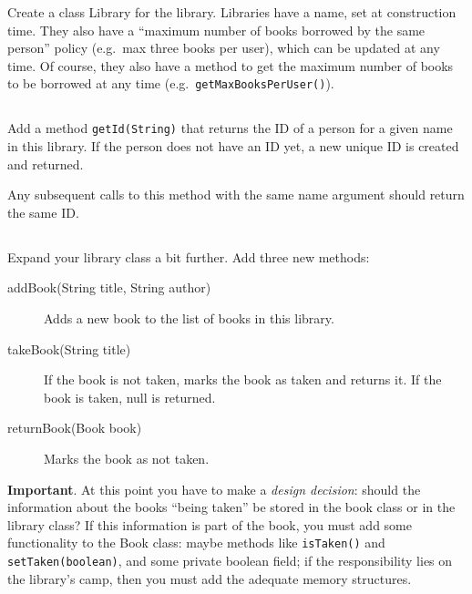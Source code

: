 \documentclass{article}
\begin{document}
Create a class Library for the library. Libraries have a name, set at
construction time. They also have a ``maximum number of books borrowed
by the same person'' policy (e.g.~max three books per user), 
which can be updated at any time. Of
course, they also have a method to get the maximum number of books to
be borrowed at any time (e.g.~\verb+getMaxBooksPerUser()+). 

\subsection{}

Add a method \verb+getId(String)+ that returns the ID of a person for
a given name in this library. If the person does not have an ID yet,
a new unique ID is created and returned. 

Any subsequent calls to this
method with the same name argument should return the same ID. 

\subsection{}

Expand your library class a bit further. Add three new methods: 

\begin{description}
\item[addBook(String title, String author)] Adds a new book to the
  list of books in this library.
\item[takeBook(String title)] If the book is not taken, marks the book
  as taken and returns it. If the book is taken, null is returned.
\item[returnBook(Book book)] Marks the book as not taken. 
\end{description}

\textbf{Important}. At this point you have to make a \emph{design
  decision}: should the information about the books ``being taken'' be
stored in the book class or in the library class? 
If this information is part of the book, you must
add some functionality to the Book class: maybe methods like
\verb+isTaken()+ and \verb+setTaken(boolean)+, and some private
boolean field; if the responsibility lies on the library's camp, then you must
add the adequate memory structures.

\subsection{}
\end{document}
